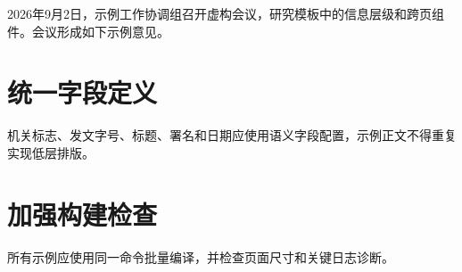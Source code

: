\documentclass{sysuredhead}
\begin{document}
\RedHeadMakeHead

2026年9月2日，示例工作协调组召开虚构会议，研究模板中的信息层级和跨页组件。会议形成如下示例意见。

\section{统一字段定义}

机关标志、发文字号、标题、署名和日期应使用语义字段配置，示例正文不得重复实现低层排版。

\section{加强构建检查}

所有示例应使用同一命令批量编译，并检查页面尺寸和关键日志诊断。


\RedHeadMakeImprint
\end{document}
